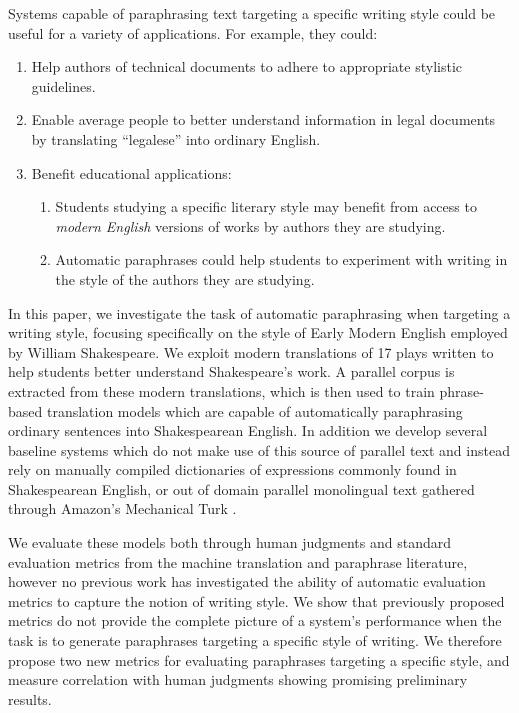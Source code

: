\documentclass[10pt,a5paper,twoside]{article}
\begin{document}
Systems capable of paraphrasing text targeting a specific writing style could be useful for a variety of applications.  For example, they could:
\begin{enumerate}
  \item Help authors of technical documents to adhere to appropriate stylistic guidelines.  
  \item Enable average people to better understand information in legal documents by translating ``legalese'' into ordinary English.  
  \item Benefit educational applications:
    \begin{enumerate}
    \item Students studying a specific literary style may benefit from access to \emph{modern English} versions of works by authors they are studying.
    \item Automatic paraphrases could help students to experiment with writing in the style of the authors they are studying.
    \end{enumerate}
\end{enumerate}

In this paper, we investigate the task of automatic paraphrasing when targeting a writing style, focusing specifically on the style of Early Modern English employed by William Shakespeare.
We exploit modern translations of 17 plays written to help students better understand Shakespeare's work.  A parallel corpus is extracted from these modern translations,
which is then used to train phrase-based translation models which are capable of automatically paraphrasing ordinary sentences into Shakespearean English.  In addition we develop several
baseline systems which do not make use of this source of parallel text and instead rely on manually compiled dictionaries of expressions commonly found in Shakespearean English, or out of
domain parallel monolingual text gathered through Amazon's Mechanical Turk \cite{chen11}.

We evaluate these models both through human judgments and standard evaluation metrics from the machine translation and paraphrase literature, however no previous work has investigated the ability of automatic
evaluation metrics to capture the notion of writing style.  
We show that previously proposed metrics do not provide the complete picture of a system's performance when the task is to generate paraphrases
targeting a specific style of writing.  We therefore propose two new metrics for evaluating paraphrases targeting a specific style, and measure correlation with human judgments showing promising
preliminary results.
\end{document}
